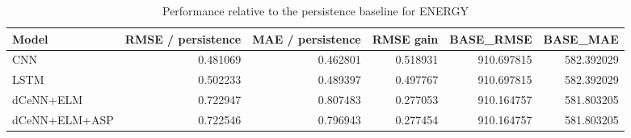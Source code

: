\begin{table}
\caption{Performance relative to the persistence baseline for ENERGY}
\begin{tabular}{lrrrrr}
\toprule
Model & RMSE / persistence & MAE / persistence & RMSE gain & BASE\_RMSE & BASE\_MAE \\
\midrule
CNN & 0.481069 & 0.462801 & 0.518931 & 910.697815 & 582.392029 \\
LSTM & 0.502233 & 0.489397 & 0.497767 & 910.697815 & 582.392029 \\
dCeNN+ELM & 0.722947 & 0.807483 & 0.277053 & 910.164757 & 581.803205 \\
dCeNN+ELM+ASP & 0.722546 & 0.796943 & 0.277454 & 910.164757 & 581.803205 \\
\bottomrule
\end{tabular}
\end{table}
